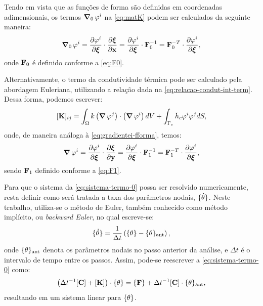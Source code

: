 \documentclass[Tese.tex]{subfiles}
\begin{document}
Tendo em vista que as funções de forma são definidas em coordenadas adimensionais, os termos $\boldsymbol{\nabla}_0\,\varphi^i$ na \cref{eq:matK} podem ser calculados da seguinte maneira:
\begin{equation}\label{eq:gradientei-fforma}
\boldsymbol{\nabla}_0\,\varphi^i = \dfrac{\partial\varphi^i}{\partial\boldsymbol{\xi}}\cdot\dfrac{\partial\boldsymbol{\xi}}{\partial\mathbf{x}} = \dfrac{\partial\varphi^i}{\partial\boldsymbol{\xi}}\cdot\mathbf{F}_0^{-1} = \mathbf{F}_0^{-T}\cdot\dfrac{\partial\varphi^i}{\partial\boldsymbol{\xi}},
\end{equation}
onde $\mathbf{F}_0$ é definido conforme a \cref{eq:F0}.

Alternativamente, o termo da condutividade térmica pode ser calculado pela abordagem Euleriana, utilizando a relação dada na \cref{eq:relacao-condut-int-term}. Dessa forma, podemos escrever:
\begin{equation}
[\mathbf{K}]_{ij} = \int_{\Omega}k\left(\boldsymbol{\nabla}\,\varphi^j\right)\cdot\left(\boldsymbol{\nabla}\,\varphi^i\right) dV + \int_{\Gamma_{c}}\bar{h}_c\varphi^i\varphi^j dS,  \\[0.1cm]
\end{equation}
onde, de maneira análoga à \cref{eq:gradientei-fforma}, temos:
\begin{equation}\label{eq:gradiente-fforma}
\boldsymbol{\nabla}\,\varphi^i = \dfrac{\partial\varphi^i}{\partial\boldsymbol{\xi}}\cdot\dfrac{\partial\boldsymbol{\xi}}{\partial\mathbf{y}} = \dfrac{\partial\varphi^i}{\partial\boldsymbol{\xi}}\cdot\mathbf{F}_1^{-1} = \mathbf{F}_1^{-T}\cdot\dfrac{\partial\varphi^i}{\partial\boldsymbol{\xi}},
\end{equation}
sendo $\mathbf{F}_1$ definido conforme a \cref{eq:F1}.

Para que o sistema da \cref{eq:sistema-termo-0} possa ser resolvido numericamente, resta definir como será tratada a taxa dos parâmetros nodais, $\{\dot{\theta}\}$. Neste trabalho, utiliza-se o método de Euler, também conhecido como método implícito, ou \emph{backward Euler}, no qual escreve-se:\begin{equation}
\{\dot{\theta}\} = \dfrac{1}{\Delta t}\left(\{\theta\} - \{\theta\}_\text{ant}\right),
\end{equation}
onde $\{\theta\}_\text{ant}$ denota os parâmetros nodais no passo anterior da análise, e $\Delta t$ é o intervalo de tempo entre os passos. Assim, pode-se reescrever a \cref{eq:sistema-termo-0} como:
\begin{equation}\label{eq:conducao-final}
\left(\Delta t^{-1}[\mathbf{C}] + [\mathbf{K}]\right)\cdot\{\theta\} = \{\mathbf{F}\} + \Delta t^{-1}[\mathbf{C}]\cdot\{\theta\}_\text{ant},
\end{equation}
resultando em um sistema linear para $\{\theta\}$.
\end{document}
